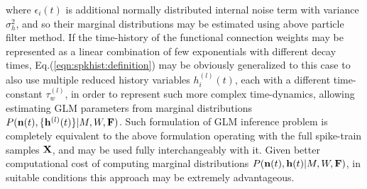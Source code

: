 where $\epsilon_i(t)$ is additional normally distributed internal noise term with variance $\sigma^2_h$, and so their marginal distributions may be estimated using above particle filter method. If the time-history of the  functional connection weights may be represented as a linear combination of few exponentials with different decay times, Eq.(\ref{eqn:spkhist:definition}) may be obviously generalized to this case to also use multiple reduced history variables $h_i^{(l)}(t)$, each with a different time-constant $\tau^{(l)}_w$, in order to represent such more complex time-dynamics, allowing estimating GLM parameters from marginal distributions $P({\bf n}(t), \{{\bf h}^{(l)}(t)\}|M, W, {\bf F})$.  Such formulation of GLM inference problem is completely equivalent to the above formulation operating with the full spike-train samples ${\bf X}$, and may be used fully interchangeably with it. Given better computational cost of computing marginal distributions $P({\bf n}(t), {\bf h}(t)|M, W, {\bf F})$, in suitable conditions this approach may be extremely advantageous.